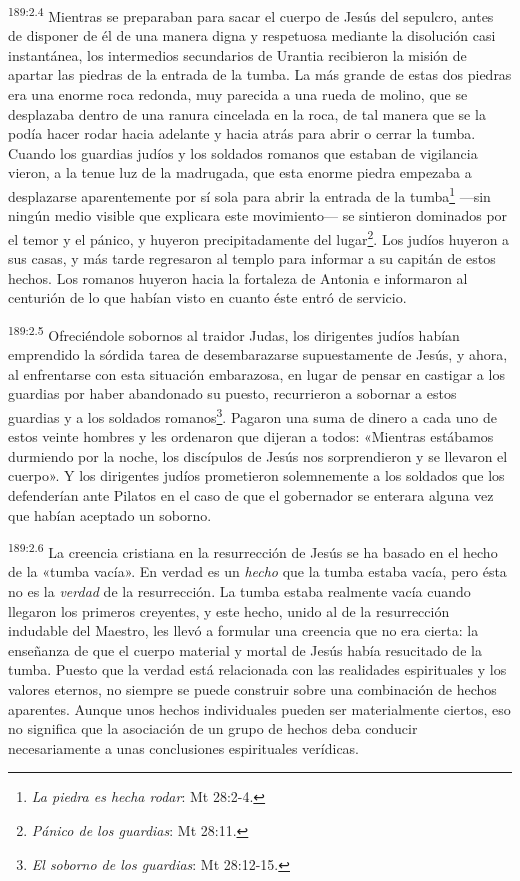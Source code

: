 \par
\textsuperscript{189:2.4} Mientras se preparaban para sacar el cuerpo de Jesús del sepulcro, antes de disponer de él de una manera digna y respetuosa mediante la disolución casi instantánea, los intermedios secundarios de Urantia recibieron la misión de apartar las piedras de la entrada de la tumba. La más grande de estas dos piedras era una enorme roca redonda, muy parecida a una rueda de molino, que se desplazaba dentro de una ranura cincelada en la roca, de tal manera que se la podía hacer rodar hacia adelante y hacia atrás para abrir o cerrar la tumba. Cuando los guardias judíos y los soldados romanos que estaban de vigilancia vieron, a la tenue luz de la madrugada, que esta enorme piedra empezaba a desplazarse aparentemente por sí sola para abrir la entrada de la tumba\footnote{\textit{La piedra es hecha rodar}: Mt 28:2-4.} ---sin ningún medio visible que explicara este movimiento--- se sintieron dominados por el temor y el pánico, y huyeron precipitadamente del lugar\footnote{\textit{Pánico de los guardias}: Mt 28:11.}. Los judíos huyeron a sus casas, y más tarde regresaron al templo para informar a su capitán de estos hechos. Los romanos huyeron hacia la fortaleza de Antonia e informaron al centurión de lo que habían visto en cuanto éste entró de servicio.

\par
\textsuperscript{189:2.5} Ofreciéndole sobornos al traidor Judas, los dirigentes judíos habían emprendido la sórdida tarea de desembarazarse supuestamente de Jesús, y ahora, al enfrentarse con esta situación embarazosa, en lugar de pensar en castigar a los guardias por haber abandonado su puesto, recurrieron a sobornar a estos guardias y a los soldados romanos\footnote{\textit{El soborno de los guardias}: Mt 28:12-15.}. Pagaron una suma de dinero a cada uno de estos veinte hombres y les ordenaron que dijeran a todos: «Mientras estábamos durmiendo por la noche, los discípulos de Jesús nos sorprendieron y se llevaron el cuerpo». Y los dirigentes judíos prometieron solemnemente a los soldados que los defenderían ante Pilatos en el caso de que el gobernador se enterara alguna vez que habían aceptado un soborno.

\par
\textsuperscript{189:2.6} La creencia cristiana en la resurrección de Jesús se ha basado en el hecho de la «tumba vacía». En verdad es un \textit{hecho} que la tumba estaba vacía, pero ésta no es la \textit{verdad} de la resurrección. La tumba estaba realmente vacía cuando llegaron los primeros creyentes, y este hecho, unido al de la resurrección indudable del Maestro, les llevó a formular una creencia que no era cierta: la enseñanza de que el cuerpo material y mortal de Jesús había resucitado de la tumba. Puesto que la verdad está relacionada con las realidades espirituales y los valores eternos, no siempre se puede construir sobre una combinación de hechos aparentes. Aunque unos hechos individuales pueden ser materialmente ciertos, eso no significa que la asociación de un grupo de hechos deba conducir necesariamente a unas conclusiones espirituales verídicas.


